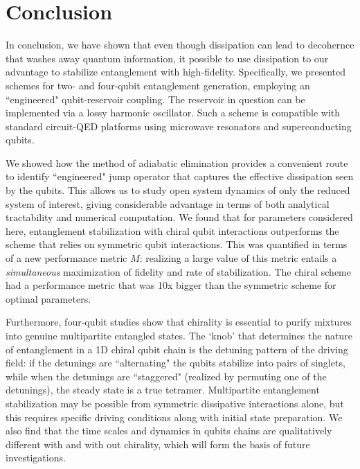 \chapter{Conclusion}

In conclusion, we have shown that even though dissipation can lead to decohernce that washes away quantum information, it possible to use dissipation to our advantage to stabilize entanglement with high-fidelity. Specifically, we presented schemes for two- and four-qubit entanglement generation, employing an ``engineered" qubit-reservoir coupling. The reservoir in question can be implemented via a lossy harmonic oscillator. Such a scheme is compatible with standard circuit-QED platforms using microwave resonators and superconducting qubits. 

We showed how the method of adiabatic elimination provides a convenient route to identify ``engineered" jump operator that captures the effective dissipation seen by the qubits. This allows us to study open system dynamics of only the reduced system of interest, giving considerable advantage in terms of both analytical tractability and numerical computation. We found that for parameters considered here, entanglement stabilization with chiral qubit interactions outperforms the scheme that relies on symmetric qubit interactions. This was quantified in terms of a new performance metric $M$: realizing a large value of this metric entails a \emph{simultaneous} maximization of fidelity and rate of stabilization. The chiral scheme had a performance metric that was 10x bigger than the symmetric scheme for optimal parameters. 

Furthermore, four-qubit studies show that chirality is essential to purify mixtures into genuine multipartite entangled states. The `knob' that determines the nature of entanglement in a 1D chiral qubit chain is the detuning pattern of the driving field: if the detunings are ``alternating" the qubits stabilize into pairs of singlets, while when the detunings are ``staggered" (realized by permuting one of the detunings), the steady state is a true tetramer. Multipartite entanglement stabilization may be possible from symmetric dissipative interactions alone, but this requires specific driving conditions along with initial state preparation. We also find that the time scales and dynamics in qubits chains are qualitatively different with and with out chirality, which will form the basis of future investigations.


